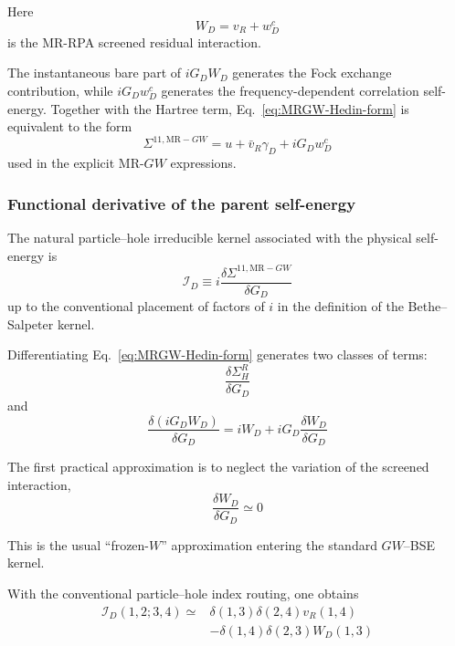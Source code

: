 \documentclass[aip,jcp,reprint,noshowkeys,superscriptaddress]{revtex4-1}
\begin{document}
Here
\begin{equation}
  W_D
  =
  v_R+w_D^c
\end{equation}
is the MR-RPA screened residual interaction.

The instantaneous bare part of $iG_DW_D$ generates the Fock exchange
contribution, while $iG_Dw_D^c$ generates the frequency-dependent
correlation self-energy.  Together with the Hartree term,
Eq.~\eqref{eq:MRGW-Hedin-form} is equivalent to the form
\begin{equation}
  \Sigma^{11,\mathrm{MR-}GW}
  =
  u
  +
  \bar v_R\gamma_D
  +
  iG_Dw_D^c
\end{equation}
used in the explicit MR-$GW$ expressions.


\subsubsection{Functional derivative of the parent self-energy}

The natural particle--hole irreducible kernel associated with the
physical self-energy is
\begin{equation}
  \mathcal I_D
  \equiv
  i
  \frac{
    \delta\Sigma^{11,\mathrm{MR-}GW}
  }{
    \delta G_D
  }
  \label{eq:kernel-functional-derivative}
\end{equation}
up to the conventional placement of factors of $i$ in the definition
of the Bethe--Salpeter kernel.

Differentiating Eq.~\eqref{eq:MRGW-Hedin-form} generates two classes of
terms:
\begin{equation}
  \frac{\delta\Sigma_H^R}{\delta G_D}
\end{equation}
and
\begin{equation}
  \frac{\delta(iG_DW_D)}{\delta G_D}
  =
  iW_D
  +
  iG_D
  \frac{\delta W_D}{\delta G_D}
\end{equation}

The first practical approximation is to neglect the variation of the
screened interaction,
\begin{equation}
  \frac{\delta W_D}{\delta G_D}
  \simeq
  0
  \label{eq:frozen-W}
\end{equation}

This is the usual ``frozen-$W$'' approximation entering the standard
$GW$--BSE kernel.

With the conventional particle--hole index routing, one obtains
\begin{equation}
  \begin{aligned}
  \mathcal I_D(1,2;3,4)
  \simeq{}&
  \delta(1,3)\delta(2,4)
  v_R(1,4)
  \\
  &-
  \delta(1,4)\delta(2,3)
  W_D(1,3)
  \end{aligned}
  \label{eq:MR-GW-BSE-kernel-dynamic}
\end{equation}
\end{document}
